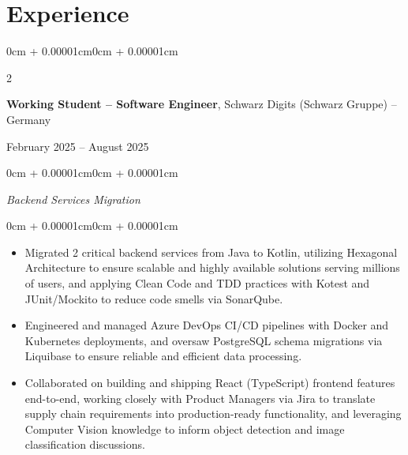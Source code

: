 \documentclass[10pt, letterpaper]{article}
\newenvironment{highlights}{
    \begin{itemize}[
        topsep=0.10cm,
        parsep=0.10cm,
        partopsep=0pt,
        itemsep=0pt,
        leftmargin=0cm + 10pt
    ]
}{
    \end{itemize}
}
\newenvironment{onecolentry}{
    \begin{adjustwidth}{0cm + 0.00001cm}{0cm + 0.00001cm}
}{
    \end{adjustwidth}
}
\newenvironment{twocolentry}[2][]{
    \onecolentry
    \def\secondColumn{#2}
    \setcolumnwidth{\fill, 5cm}
    \begin{paracol}{2}
}{
    \switchcolumn \raggedleft \secondColumn
    \end{paracol}
    \endonecolentry
}
\begin{document}
\section{Experience}
\begin{twocolentry}{February 2025 – August 2025}
    \textbf{Working Student – Software Engineer}, Schwarz Digits (Schwarz Gruppe) -- Germany
\end{twocolentry}
\vspace{0.10cm}
\begin{onecolentry}
\textit{Backend Services Migration}
\end{onecolentry}
\vspace{0.05cm}
\begin{onecolentry}
\begin{highlights}
    \item Migrated 2 critical backend services from Java to Kotlin, utilizing Hexagonal Architecture to ensure scalable and highly available solutions serving millions of users, and applying Clean Code and TDD practices with Kotest and JUnit/Mockito to reduce code smells via SonarQube.
    \item Engineered and managed Azure DevOps CI/CD pipelines with Docker and Kubernetes deployments, and oversaw PostgreSQL schema migrations via Liquibase to ensure reliable and efficient data processing.
    \item Collaborated on building and shipping React (TypeScript) frontend features end-to-end, working closely with Product Managers via Jira to translate supply chain requirements into production-ready functionality, and leveraging Computer Vision knowledge to inform object detection and image classification discussions.
\end{highlights}
\end{onecolentry}

\vspace{0.3cm}
\end{document}
